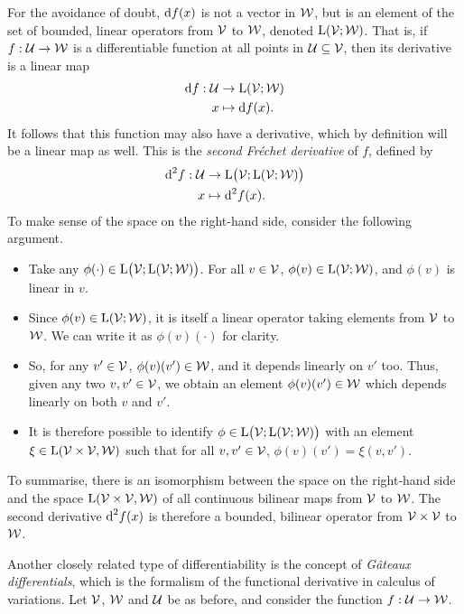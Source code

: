 For the avoidance of doubt, $\text{d} f(x)$ is not a vector in ${\mathcal W}$, but is an element of the set of bounded, linear operators from ${\mathcal V}$ to ${\mathcal W}$, denoted $\text{L}({\mathcal V};{\mathcal W})$.
That is, if $f:{\mathcal U}\to{\mathcal W}$ is a differentiable function at all points in ${\mathcal U}\subseteq{\mathcal V}$, then its derivative is a linear map
\begin{align*}
  \text{d} f: {\mathcal U} &\to \text{L}({\mathcal V};{\mathcal W}) \\
  x &\mapsto \text{d} f(x).
\end{align*}
It follows that this function may also have a derivative, which by definition will be a linear map as well.
This is the \emph{second Fréchet derivative} of $f$, defined by
\begin{align*}
  \text{d}^2 f: {\mathcal U} &\to \text{L}\big({\mathcal V};\text{L}({\mathcal V};{\mathcal W})\big) \\
  x &\mapsto \text{d}^2f(x).
\end{align*}
To make sense of the space on the right-hand side, consider the following argument.
\begin{itemize}
  \item Take any $\phi(\cdot) \in \text{L}\big({\mathcal V};\text{L}({\mathcal V};{\mathcal W})\big)$. For all $v\in{\mathcal V}$, $\phi(v)\in\text{L}({\mathcal V};{\mathcal W})$, and $\phi(v)$ is linear in $v$.
  \item Since $\phi(v)\in\text{L}({\mathcal V};{\mathcal W})$, it is itself a linear operator taking elements from ${\mathcal V}$ to ${\mathcal W}$. We can write it as $\phi(v)(\cdot)$ for clarity.
  \item So, for any $v'\in{\mathcal V}$, $\phi(v)(v')\in{\mathcal W}$, and it depends linearly on $v'$ too. Thus, given any two $v,v'\in{\mathcal V}$, we obtain an element $\phi(v)(v')\in{\mathcal W}$ which depends linearly on both $v$ and $v'$.
  \item It is therefore possible to identify $\phi \in \text{L}\big({\mathcal V};\text{L}({\mathcal V};{\mathcal W})\big)$ with an element $\xi \in \text{L}({\mathcal V} \times {\mathcal V}, {\mathcal W})$ such that for all $v,v'\in{\mathcal V}$, $\phi(v)(v') = \xi(v,v')$.
\end{itemize}
To summarise, there is an isomorphism between the space on the right-hand side and the space $\text{L}({\mathcal V} \times {\mathcal V}, {\mathcal W})$ of all continuous bilinear maps from ${\mathcal V}$ to ${\mathcal W}$.
The second derivative $\text{d}^2 f(x)$ is therefore a bounded, bilinear operator from ${\mathcal V}\times{\mathcal V}$ to ${\mathcal W}$.

Another closely related type of differentiability is the concept of \emph{Gâteaux differentials}, which is the formalism of the functional derivative in calculus of variations.
Let ${\mathcal V}$, ${\mathcal W}$ and ${\mathcal U}$ be as before, and consider the function $f:{\mathcal U}\to{\mathcal W}$.

